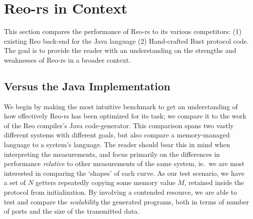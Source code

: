 \section{Reo-rs in Context}
\label{sec:in_context}
This section compares the performance of Reo-rs to its various competitors: (1) existing Reo back-end for the Java language (2) Hand-crafted Rust protocol code. The goal is to provide the reader with an understanding on the strengths and weaknesses of Reo-rs in a broader context.

\subsection{Versus the Java Implementation}
We begin by making the most intuitive benchmark to get an understanding of how effectively Reo-rs has been optimized for its task; we compare it to the work of the Reo compiler's Java code-generator. This comparison spans two vastly different systems with different goals, but also compare a memory-managed language to a system's language. The reader should bear this in mind when interpreting the measurements, and focus primarily on the differences in performance \textit{relative} to other measurements of the same system, ie.\ we are most interested in comparing the `shapes' of each curve. As our test scenario, we have a set of $N$ getters repeatedly copying some memory value $M$, retained inside the protocol from initialization. By involving a contended resource, we are able to test and compare the \textit{scalability} the generated programs, both in terms of number of ports and the size of the transmitted data.


